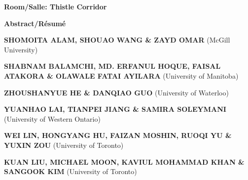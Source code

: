 \begin{center}\large\bfseries Room/Salle: Thistle Corridor\end{center}
\label{abs-sid:cgf}
\begin{center}{\large\bfseries Abstract/R\'esum\'e}
\end{center}
\def\whenwhere{[Monday May 30 / lundi 30 mai, 12:00]\\}
{%
\medskip\par\textbf{SHOMOITA ALAM, SHOUAO WANG \& ZAYD OMAR} (McGill University)
}
\def\whenwhere{[Monday May 30 / lundi 30 mai, 12:00]\\}
{%
\medskip\par\textbf{SHABNAM BALAMCHI, MD. ERFANUL HOQUE, FAISAL ATAKORA \& OLAWALE FATAI AYILARA} (University of Manitoba)
}
\def\whenwhere{[Monday May 30 / lundi 30 mai, 12:00]\\}
{%
\medskip\par\textbf{ZHOUSHANYUE HE \& DANQIAO GUO} (University of Waterloo)
}
\def\whenwhere{[Monday May 30 / lundi 30 mai, 12:00]\\}
{%
\medskip\par\textbf{YUANHAO LAI, TIANPEI JIANG \& SAMIRA SOLEYMANI} (University of Western Ontario)
}
\def\whenwhere{[Monday May 30 / lundi 30 mai, 12:00]\\}
{%
\medskip\par\textbf{WEI LIN, HONGYANG HU, FAIZAN MOSHIN, RUOQI YU \& YUXIN ZOU} (University of Toronto)
}
\def\whenwhere{[Monday May 30 / lundi 30 mai, 12:00]\\}
{%
\medskip\par\textbf{KUAN LIU, MICHAEL MOON, KAVIUL MOHAMMAD KHAN \& SANGOOK KIM} (University of Toronto)
}
